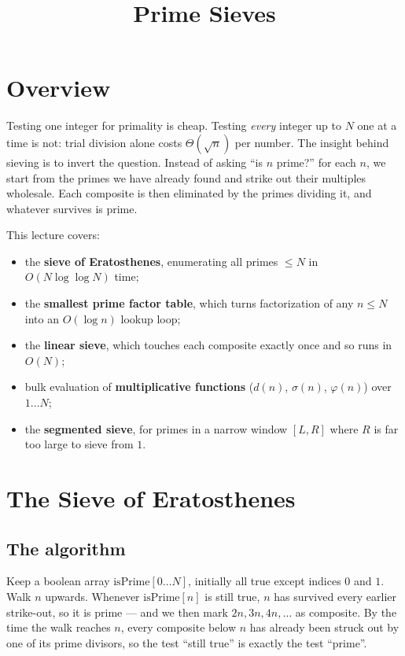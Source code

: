\documentclass[11pt]{article}
\title{Prime Sieves}
\author{}
\date{}
\begin{document}
\thispagestyle{fancy}


\section{Overview}
Testing one integer for primality is cheap. Testing \emph{every} integer up to
$N$ one at a time is not: trial division alone costs $\Theta(\sqrt{n})$ per
number. The insight behind sieving is to invert the question. Instead of
asking ``is $n$ prime?'' for each $n$, we start from the primes we have
already found and strike out their multiples wholesale. Each composite is
then eliminated by the primes dividing it, and whatever survives is prime.

This lecture covers:
\begin{itemize}[leftmargin=1.5em]
  \item the \textbf{sieve of Eratosthenes}, enumerating all primes $\le N$ in
        $O(N \log\log N)$ time;
  \item the \textbf{smallest prime factor table}, which turns factorization of
        any $n \le N$ into an $O(\log n)$ lookup loop;
  \item the \textbf{linear sieve}, which touches each composite exactly once
        and so runs in $O(N)$;
  \item bulk evaluation of \textbf{multiplicative functions}
        ($d(n)$, $\sigma(n)$, $\varphi(n)$) over $1 \ldots N$;
  \item the \textbf{segmented sieve}, for primes in a narrow window $[L, R]$
        where $R$ is far too large to sieve from $1$.
\end{itemize}

\section{The Sieve of Eratosthenes}

\subsection{The algorithm}
Keep a boolean array $\mathrm{isPrime}[0 \ldots N]$, initially all true except
indices $0$ and $1$. Walk $n$ upwards. Whenever $\mathrm{isPrime}[n]$ is still
true, $n$ has survived every earlier strike-out, so it is prime --- and we
then mark $2n, 3n, 4n, \ldots$ as composite. By the time the walk reaches $n$,
every composite below $n$ has already been struck out by one of its prime
divisors, so the test ``still true'' is exactly the test ``prime''.
\end{document}
